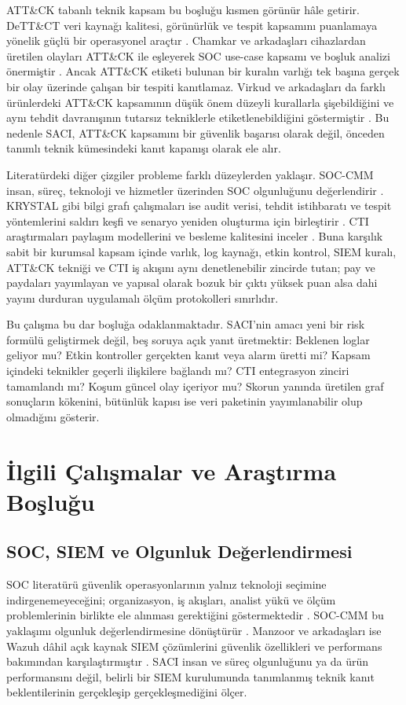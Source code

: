 \documentclass[conference]{IEEEtran}
\begin{document}
ATT\&CK tabanlı teknik kapsam bu boşluğu kısmen görünür hâle getirir. DeTT\&CT veri kaynağı kalitesi, görünürlük ve tespit kapsamını puanlamaya yönelik güçlü bir operasyonel araçtır \cite{dettect}. Chamkar ve arkadaşları cihazlardan üretilen olayları ATT\&CK ile eşleyerek SOC use-case kapsamı ve boşluk analizi önermiştir \cite{chamkar2024}. Ancak ATT\&CK etiketi bulunan bir kuralın varlığı tek başına gerçek bir olay üzerinde çalışan bir tespiti kanıtlamaz. Virkud ve arkadaşları da farklı ürünlerdeki ATT\&CK kapsamının düşük önem düzeyli kurallarla şişebildiğini ve aynı tehdit davranışının tutarsız tekniklerle etiketlenebildiğini göstermiştir \cite{virkud2024}. Bu nedenle SACI, ATT\&CK kapsamını bir güvenlik başarısı olarak değil, önceden tanımlı teknik kümesindeki kanıt kapanışı olarak ele alır.

Literatürdeki diğer çizgiler probleme farklı düzeylerden yaklaşır. SOC-CMM insan, süreç, teknoloji ve hizmetler üzerinden SOC olgunluğunu değerlendirir \cite{soccmm}. KRYSTAL gibi bilgi grafı çalışmaları ise audit verisi, tehdit istihbaratı ve tespit yöntemlerini saldırı keşfi ve senaryo yeniden oluşturma için birleştirir \cite{krystal2022}. CTI araştırmaları paylaşım modellerini ve besleme kalitesini inceler \cite{mavroeidis2017,griffioen2020}. Buna karşılık sabit bir kurumsal kapsam içinde varlık, log kaynağı, etkin kontrol, SIEM kuralı, ATT\&CK tekniği ve CTI iş akışını aynı denetlenebilir zincirde tutan; pay ve paydaları yayımlayan ve yapısal olarak bozuk bir çıktı yüksek puan alsa dahi yayını durduran uygulamalı ölçüm protokolleri sınırlıdır.

Bu çalışma bu dar boşluğa odaklanmaktadır. SACI'nin amacı yeni bir risk formülü geliştirmek değil, beş soruya açık yanıt üretmektir: Beklenen loglar geliyor mu? Etkin kontroller gerçekten kanıt veya alarm üretti mi? Kapsam içindeki teknikler geçerli ilişkilere bağlandı mı? CTI entegrasyon zinciri tamamlandı mı? Koşum güncel olay içeriyor mu? Skorun yanında üretilen graf sonuçların kökenini, bütünlük kapısı ise veri paketinin yayımlanabilir olup olmadığını gösterir.

\section{İlgili Çalışmalar ve Araştırma Boşluğu}
\subsection{SOC, SIEM ve Olgunluk Değerlendirmesi}
SOC literatürü güvenlik operasyonlarının yalnız teknoloji seçimine indirgenemeyeceğini; organizasyon, iş akışları, analist yükü ve ölçüm problemlerinin birlikte ele alınması gerektiğini göstermektedir \cite{vielberth2020,agyepong2020,sundaramurthy2014}. SOC-CMM bu yaklaşımı olgunluk değerlendirmesine dönüştürür \cite{soccmm}. Manzoor ve arkadaşları ise Wazuh dâhil açık kaynak SIEM çözümlerini güvenlik özellikleri ve performans bakımından karşılaştırmıştır \cite{manzoor2024}. SACI insan ve süreç olgunluğunu ya da ürün performansını değil, belirli bir SIEM kurulumunda tanımlanmış teknik kanıt beklentilerinin gerçekleşip gerçekleşmediğini ölçer.
\end{document}
